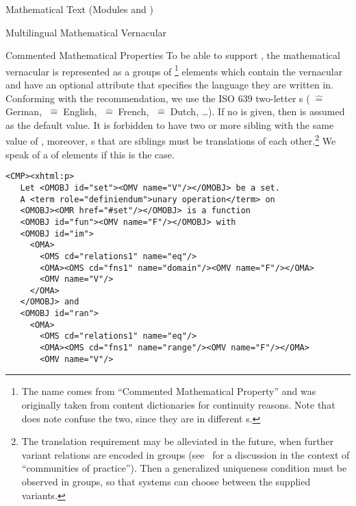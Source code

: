 \begin{tchapter}[id=mtxt,short=Mathematical Text]{Mathematical Text (Modules
   and )}
\begin{tsection}[id=mtext]{Multilingual Mathematical Vernacular}
\begin{tsubsection}{Commented Mathematical Properties}
  To be able to support
  ,
  the mathematical vernacular is represented as a groups of \footnote{The
    name comes from ``Commented Mathematical Property'' and was originally taken from
    {\openmath} content dictionaries for continuity
    reasons. Note that {\xml} does note confuse the two, since they are in different
    {s}.}  elements which contain the vernacular and have an optional
   attribute that specifies the language they are
  written in. Conforming with the {\xml} recommendation, we use the ISO
  639 two-letter {s}
  ($\;\widehat=\;$German, $\;\widehat=\;$English,
  $\;\widehat=\;$French, $\;\widehat=\;$Dutch, \ldots). If
  no  is given, then  is
  assumed as the default value. It is forbidden to have two or more sibling
   with the same value of , moreover,
  s that are siblings must be translations of each other.\footnote{The
    translation requirement may be alleviated in the future, when further variant
    relations are encoded in  groups (see~\cite{KohKoh:copmem06} for a
    discussion in the context of ``communities of practice''). Then a generalized
    uniqueness condition must be observed in  groups, so that systems can
    choose between the supplied variants.} We speak of a 
  of  elements if this is the case.
\begin{lstlisting}[escapechar=\%,label=lst:multiling,mathescape,
  caption={A Multilingual Group of \element{CMP} Elements},
  index={trl,xml:lang,CMP,FMP,OMOBJ}]
 <CMP><xhtml:p>
   Let <OMOBJ id="set"><OMV name="V"/></OMOBJ> be a set. 
   A <term role="definiendum">unary operation</term> on 
   <OMOBJ><OMR href="#set"/></OMOBJ> is a function  
   <OMOBJ id="fun"><OMV name="F"/></OMOBJ> with
   <OMOBJ id="im">
     <OMA>
       <OMS cd="relations1" name="eq"/>
       <OMA><OMS cd="fns1" name="domain"/><OMV name="F"/></OMA>
       <OMV name="V"/>
     </OMA>
   </OMOBJ> and 
   <OMOBJ id="ran">
     <OMA>
       <OMS cd="relations1" name="eq"/>
       <OMA><OMS cd="fns1" name="range"/><OMV name="F"/></OMA>
       <OMV name="V"/>

\end{lstlisting}
\end{tsubsection}
\end{tsection}
\end{tchapter}
